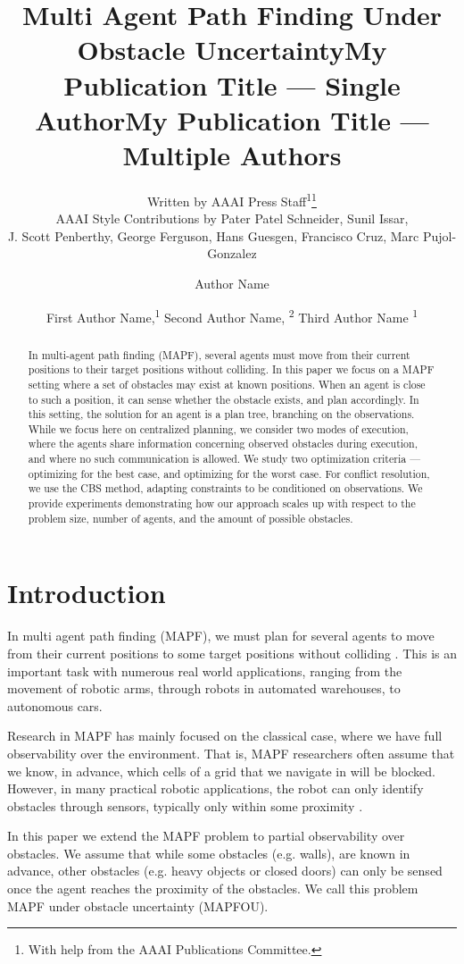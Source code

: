 \documentclass[letterpaper]{article} %
\title{Multi Agent Path Finding Under Obstacle Uncertainty}
\author{
    Written by AAAI Press Staff\textsuperscript{\rm 1}\thanks{With help from the AAAI Publications Committee.}\\
    AAAI Style Contributions by Pater Patel Schneider,
    Sunil Issar,\\
    J. Scott Penberthy,
    George Ferguson,
    Hans Guesgen,
    Francisco Cruz\equalcontrib,
    Marc Pujol-Gonzalez\equalcontrib
}
\title{My Publication Title --- Single Author}
\author {
    Author Name
}
\title{My Publication Title --- Multiple Authors}
\author {
    First Author Name,\textsuperscript{\rm 1}
    Second Author Name, \textsuperscript{\rm 2}
    Third Author Name \textsuperscript{\rm 1}
}
\begin{document}
\maketitle

\begin{abstract}
In multi-agent path finding (MAPF), several agents must move from their current positions to their target positions without colliding. In this paper we focus on a MAPF setting where a set of obstacles may exist at known positions. When an agent is close to such a position, it can sense whether the obstacle exists, and plan accordingly. In this setting, the solution for an agent is a plan tree, branching on the observations.
While we focus here on centralized planning, we consider two modes of execution, where the agents share information concerning observed obstacles during execution, and where no such communication is allowed.
We study two optimization criteria --- optimizing for the best case, and optimizing for the worst case. 
For conflict resolution, we use the CBS method, adapting constraints to be conditioned on observations.
We provide experiments demonstrating how our approach scales up with respect to the problem size, number of agents, and the amount of possible obstacles.

\end{abstract}




\section{Introduction}

In multi agent path finding (MAPF), we must plan for several agents to move from their current positions to some target positions without colliding \cite{stern2019multi}. This is an important task with numerous real world applications, ranging from the movement of robotic arms, through robots in automated warehouses, to autonomous cars. 

Research in MAPF has mainly focused on the classical case, where we have full observability over the environment. That is, MAPF researchers often assume that we know, in advance, which cells of a grid that we navigate in will be blocked. However, in many practical robotic applications, the robot can only identify obstacles through sensors, typically only within some proximity \cite{lenser2003visual}.

In this paper we extend the MAPF problem to partial observability over obstacles. We assume that while some obstacles (e.g. walls), are known in advance, other obstacles (e.g. heavy objects or closed doors) can only be sensed once the agent reaches the proximity of the obstacles. We call this problem MAPF under obstacle uncertainty (MAPFOU).
\end{document}
